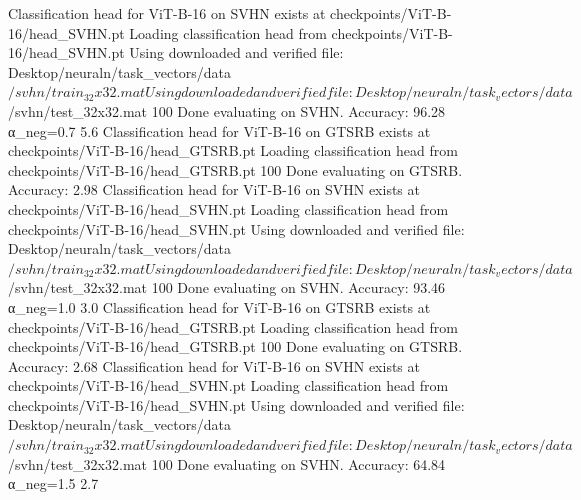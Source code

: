 Classification head for ViT-B-16 on SVHN exists at checkpoints/ViT-B-16/head_SVHN.pt
Loading classification head from checkpoints/ViT-B-16/head_SVHN.pt
Using downloaded and verified file: Desktop/neuraln/task_vectors/data$/svhn/train_32x32.mat
Using downloaded and verified file: Desktop/neuraln/task_vectors/data$/svhn/test_32x32.mat
100%
Done evaluating on SVHN. Accuracy: 96.28%
  α_neg=0.7          5.6%
Classification head for ViT-B-16 on GTSRB exists at checkpoints/ViT-B-16/head_GTSRB.pt
Loading classification head from checkpoints/ViT-B-16/head_GTSRB.pt
100%
Done evaluating on GTSRB. Accuracy: 2.98%
Classification head for ViT-B-16 on SVHN exists at checkpoints/ViT-B-16/head_SVHN.pt
Loading classification head from checkpoints/ViT-B-16/head_SVHN.pt
Using downloaded and verified file: Desktop/neuraln/task_vectors/data$/svhn/train_32x32.mat
Using downloaded and verified file: Desktop/neuraln/task_vectors/data$/svhn/test_32x32.mat
100%
Done evaluating on SVHN. Accuracy: 93.46%
  α_neg=1.0          3.0%
Classification head for ViT-B-16 on GTSRB exists at checkpoints/ViT-B-16/head_GTSRB.pt
Loading classification head from checkpoints/ViT-B-16/head_GTSRB.pt
100%
Done evaluating on GTSRB. Accuracy: 2.68%
Classification head for ViT-B-16 on SVHN exists at checkpoints/ViT-B-16/head_SVHN.pt
Loading classification head from checkpoints/ViT-B-16/head_SVHN.pt
Using downloaded and verified file: Desktop/neuraln/task_vectors/data$/svhn/train_32x32.mat
Using downloaded and verified file: Desktop/neuraln/task_vectors/data$/svhn/test_32x32.mat
100%
Done evaluating on SVHN. Accuracy: 64.84%
  α_neg=1.5          2.7%


